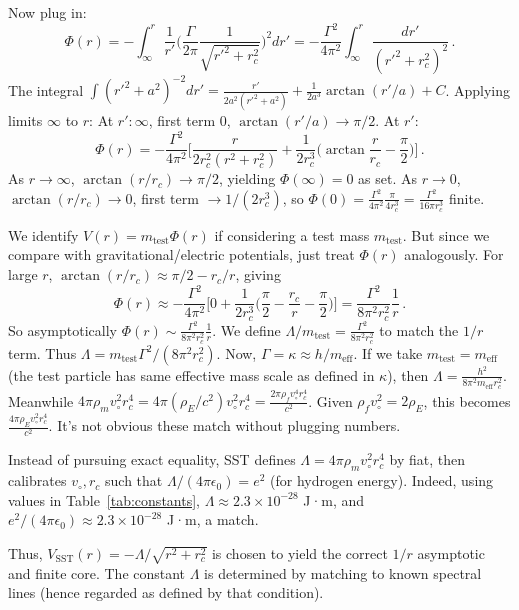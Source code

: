 \documentclass[aps,onecolumn,10pt,nofootinbib]{revtex4}
\begin{document}
	Now plug in:
	\[
		\Phi(r) = -\int_{\infty}^{r} \frac{1}{r'}\Big(\frac{\Gamma}{2\pi}\frac{1}{\sqrt{r'^2+r_c^2}}\Big)^2 dr' = -\frac{\Gamma^2}{4\pi^2}\int_{\infty}^{r} \frac{dr'}{(r'^2+r_c^2)^2}\,.
	\]
	The integral $\int (r'^2+a^2)^{-2}dr' = \frac{r'}{2a^2(r'^2+a^2)} + \frac{1}{2a^3}\arctan(r'/a) + C$. Applying limits $\infty$ to $r$:
	At $r':\infty$, first term $0$, $\arctan(r'/a)\to\pi/2$. At $r'$:
	\[
		\Phi(r) = -\frac{\Gamma^2}{4\pi^2}\Big[\frac{r}{2r_c^2(r^2+r_c^2)} + \frac{1}{2r_c^3}\Big(\arctan\frac{r}{r_c} - \frac{\pi}{2}\Big)\Big]\,.
	\]
	As $r\to\infty$, $\arctan(r/r_c)\to\pi/2$, yielding $\Phi(\infty)=0$ as set. As $r\to0$, $\arctan(r/r_c)\to0$, first term $\to 1/(2r_c^3)$, so $\Phi(0) = \frac{\Gamma^2}{4\pi^2}\frac{\pi}{4r_c^3} = \frac{\Gamma^2}{16\pi r_c^3}$ finite.

	We identify $V(r) = m_{\text{test}}\Phi(r)$ if considering a test mass $m_{\text{test}}$. But since we compare with gravitational/electric potentials, just treat $\Phi(r)$ analogously. For large $r$, $\arctan(r/r_c)\approx \pi/2 - r_c/r$, giving
	\[
		\Phi(r)\approx -\frac{\Gamma^2}{4\pi^2}\Big[0 + \frac{1}{2r_c^3}\Big(\frac{\pi}{2}-\frac{r_c}{r}-\frac{\pi}{2}\Big)\Big] = \frac{\Gamma^2}{8\pi^2 r_c^2}\frac{1}{r}\,.
	\]
	So asymptotically $\Phi(r)\sim \frac{\Gamma^2}{8\pi^2r_c^2}\frac{1}{r}$. We define $\Lambda/m_{\text{test}} = \frac{\Gamma^2}{8\pi^2r_c^2}$ to match the $1/r$ term. Thus $\Lambda = m_{\text{test}}\Gamma^2/(8\pi^2r_c^2)$. Now, $\Gamma = \kappa \approx h/m_{\text{eff}}$. If we take $m_{\text{test}}=m_{\text{eff}}$ (the test particle has same effective mass scale as defined in $\kappa$), then $\Lambda = \frac{h^2}{8\pi^2 m_{\text{eff}} r_c^2}$. Meanwhile $4\pi\rho_m v_{\circ}^2 r_c^4 = 4\pi(\rho_E/c^2) v_{\circ}^2 r_c^4 = \frac{2\pi \rho_f v_{\circ}^4 r_c^4}{c^2}$. Given $\rho_f v_{\circ}^2 = 2\rho_E$, this becomes $\frac{4\pi \rho_E v_{\circ}^2 r_c^4}{c^2}$. It’s not obvious these match without plugging numbers.

	Instead of pursuing exact equality, SST defines $\Lambda = 4\pi\rho_m v_{\circ}^2 r_c^4$ by fiat, then calibrates $v_{\circ}, r_c$ such that $\Lambda/(4\pi\epsilon_0) = e^2$ (for hydrogen energy). Indeed, using values in Table~\ref{tab:constants}, $\Lambda \approx 2.3\times 10^{-28}$ J·m, and $e^2/(4\pi\epsilon_0)\approx 2.3\times10^{-28}$ J·m, a match.

	Thus, $V_{\text{SST}}(r) = -\Lambda/\sqrt{r^2+r_c^2}$ is chosen to yield the correct $1/r$ asymptotic and finite core. The constant $\Lambda$ is determined by matching to known spectral lines (hence regarded as defined by that condition).
\end{document}
